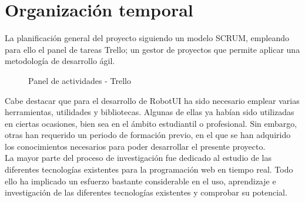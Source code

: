 

\newpage


\chapter{Organización temporal}
\label{chap:planificación}

La planificación general del proyecto siguiendo un modelo SCRUM, empleando para ello el panel de tareas Trello; un gestor de proyectos que permite aplicar una metodología de desarrollo ágil.\\

\begin{figure}[H]
\caption{Panel de actividades - Trello}
\end{figure}


Cabe destacar que para el desarrollo de RobotUI ha sido necesario emplear varias herramientas, utilidades y bibliotecas. Algunas de ellas ya habían sido utilizadas en ciertas ocasiones, bien sea en el ámbito estudiantil o profesional. 
Sin embargo, otras han requerido un periodo de formación previo, en el que se han adquirido los conocimientos necesarios para poder desarrollar el presente proyecto.\\

La mayor parte del proceso de investigación fue dedicado al estudio de las diferentes tecnologías existentes para la programación web en tiempo real. Todo ello ha implicado un esfuerzo bastante considerable en el uso, 
aprendizaje e investigación de las diferentes tecnologías existentes y comprobar su potencial.\\

